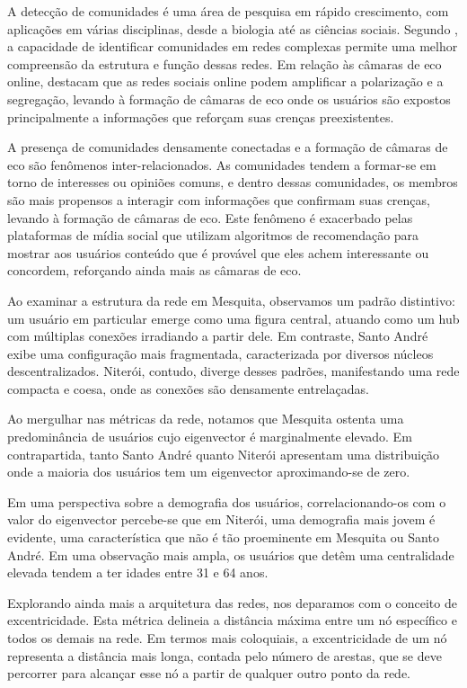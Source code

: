 A detecção de comunidades é uma área de pesquisa em rápido crescimento, com aplicações em várias disciplinas, desde a biologia até as ciências sociais. Segundo , a capacidade de identificar comunidades em redes complexas permite uma melhor compreensão da estrutura e função dessas redes. Em relação às câmaras de eco online,  destacam que as redes sociais online podem amplificar a polarização e a segregação, levando à formação de câmaras de eco onde os usuários são expostos principalmente a informações que reforçam suas crenças preexistentes.

A presença de comunidades densamente conectadas e a formação de câmaras de eco são fenômenos inter-relacionados. As comunidades tendem a formar-se em torno de interesses ou opiniões comuns, e dentro dessas comunidades, os membros são mais propensos a interagir com informações que confirmam suas crenças, levando à formação de câmaras de eco. Este fenômeno é exacerbado pelas plataformas de mídia social que utilizam algoritmos de recomendação para mostrar aos usuários conteúdo que é provável que eles achem interessante ou concordem, reforçando ainda mais as câmaras de eco.

Ao examinar a estrutura da rede em Mesquita, observamos um padrão distintivo: um usuário em particular emerge como uma figura central, atuando como um hub com múltiplas conexões irradiando a partir dele. Em contraste, Santo André exibe uma configuração mais fragmentada, caracterizada por diversos núcleos descentralizados. Niterói, contudo, diverge desses padrões, manifestando uma rede compacta e coesa, onde as conexões são densamente entrelaçadas.

Ao mergulhar nas métricas da rede, notamos que Mesquita ostenta uma predominância de usuários cujo eigenvector é marginalmente elevado. Em contrapartida, tanto Santo André quanto Niterói apresentam uma distribuição onde a maioria dos usuários tem um eigenvector aproximando-se de zero.

Em uma perspectiva sobre a demografia dos usuários, correlacionando-os com o valor do eigenvector percebe-se que em Niterói, uma demografia mais jovem é evidente, uma característica que não é tão proeminente em Mesquita ou Santo André. Em uma observação mais ampla, os usuários que detêm uma centralidade elevada tendem a ter idades entre 31 e 64 anos.

Explorando ainda mais a arquitetura das redes, nos deparamos com o conceito de excentricidade. Esta métrica delineia a distância máxima entre um nó específico e todos os demais na rede. Em termos mais coloquiais, a excentricidade de um nó representa a distância mais longa, contada pelo número de arestas, que se deve percorrer para alcançar esse nó a partir de qualquer outro ponto da rede.

